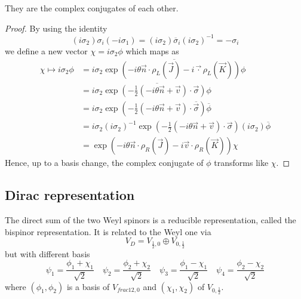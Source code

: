     They are the complex conjugates of each other. 
    
    \begin{proof}
        By using the identity
        \begin{equation*}
            (i \sigma_2) \sigma_i (- i \sigma_1) = (i \sigma_2) \overline \sigma_i (i \sigma_2)^{-1} = - \sigma_i
        \end{equation*}
        we define a new vector $\chi = i \sigma_2 \phi$ which maps as
        \begin{equation*}
        \begin{aligned}
            \chi \mapsto i \sigma_2 \phi & = i \sigma_2 \overline{\exp(-i \theta \vec n \cdot \rho_L(\vec J) - i \vec \cdot \rho_L(\vec K)) \phi} \\ & = i \sigma_2 \overline{\exp(-\frac{1}{2} (- i \theta \vec n + \vec v) \cdot \vec \sigma) \phi} \\ & = i \sigma_2 \exp(-\frac{1}{2} (- i \theta \vec n + \vec v) \cdot \overline{\vec \sigma}) \overline \phi \\ & = i \sigma_2 (i \sigma_2)^{-1} \exp(-\frac{1}{2} (- i \theta \vec n + \vec v) \cdot \vec \sigma) (i \sigma_2) \overline \phi \\ & = \exp(- i \theta \vec n \cdot \rho_R(\vec J) - i \vec v \cdot \rho_R (\vec K)) \chi
        \end{aligned}
        \end{equation*}
        Hence, up to a basis change, the complex conjugate of $\phi$ transforms like $\chi$.
    \end{proof} 

\subsection{Dirac representation}

    The direct sum of the two Weyl spinors is a reducible representation, called the bispinor representation. It is related to the Weyl one via 
    \begin{equation*}
        V_D = V_{\frac{1}{2}, 0} \oplus V_{0, \frac{1}{2}}
    \end{equation*}
    but with different basis 
    \begin{equation*}
        \psi_1 = \frac{\phi_1 + \chi_1}{\sqrt 2} \quad \psi_2 = \frac{\phi_2 + \chi_2}{\sqrt 2} \quad \psi_3 = \frac{\phi_1 - \chi_1}{\sqrt 2} \quad \psi_4 = \frac{\phi_2 - \chi_2}{\sqrt 2}
    \end{equation*}
    where $(\phi_1, \phi_2)$ is a basis of $V_{frac{1}{2}, 0}$ and $(\chi_1, \chi_2)$ of $V_{0, \frac{1}{2}}$. 


